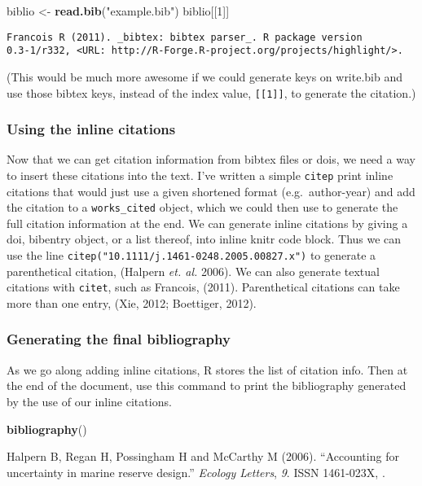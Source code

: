 \documentclass[]{article}
\newenvironment{Shaded}{}{}
\newcommand{\KeywordTok}[1]{\textcolor[rgb]{0.00,0.44,0.13}{\textbf{{#1}}}}
\newcommand{\DecValTok}[1]{\textcolor[rgb]{0.25,0.63,0.44}{{#1}}}
\newcommand{\StringTok}[1]{\textcolor[rgb]{0.25,0.44,0.63}{{#1}}}
\newcommand{\NormalTok}[1]{{#1}}
\begin{document}
\begin{Shaded}
\begin{Highlighting}[]
\NormalTok{biblio <- }\KeywordTok{read.bib}\NormalTok{(}\StringTok{"example.bib"}\NormalTok{)}
\NormalTok{biblio[[}\DecValTok{1}\NormalTok{]]}
\end{Highlighting}
\end{Shaded}
\begin{verbatim}
Francois R (2011). _bibtex: bibtex parser_. R package version
0.3-1/r332, <URL: http://R-Forge.R-project.org/projects/highlight/>.
\end{verbatim}
(This would be much more awesome if we could generate keys on write.bib
and use those bibtex keys, instead of the index value,
\texttt{{[}{[}1{]}{]}}, to generate the citation.)

\subsubsection{Using the inline citations}

Now that we can get citation information from bibtex files or dois, we
need a way to insert these citations into the text. I've written a
simple \texttt{citep} print inline citations that would just use a given
shortened format (e.g.~author-year) and add the citation to a
\texttt{works\_cited} object, which we could then use to generate the
full citation information at the end. We can generate inline citations
by giving a doi, bibentry object, or a list thereof, into inline knitr
code block. Thus we can use the line
\texttt{citep("10.1111/j.1461-0248.2005.00827.x")} to generate a
parenthetical citation, (Halpern \emph{et. al.} 2006). We can also
generate textual citations with \texttt{citet}, such as Francois,
(2011). Parenthetical citations can take more than one entry, (Xie,
2012; Boettiger, 2012).

\subsubsection{Generating the final bibliography}

As we go along adding inline citations, R stores the list of citation
info. Then at the end of the document, use this command to print the
bibliography generated by the use of our inline citations.

\begin{Shaded}
\begin{Highlighting}[]
\KeywordTok{bibliography}\NormalTok{()}
\end{Highlighting}
\end{Shaded}
Halpern B, Regan H, Possingham H and McCarthy M (2006). ``Accounting for
uncertainty in marine reserve design.'' \emph{Ecology Letters},
\emph{9}. ISSN 1461-023X, .
\end{document}
